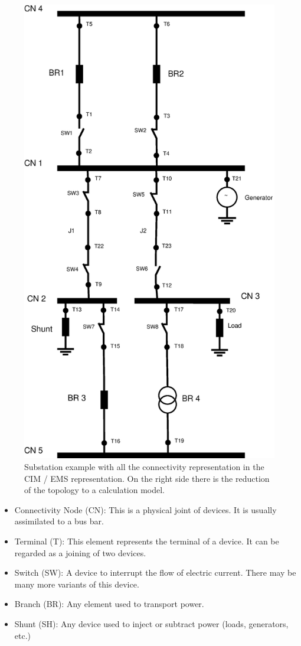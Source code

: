\documentclass[nols,a4paper,twoside,notoc,fleqn]{tufte-book}
\begin{document}
\begin{figure}
	\includegraphics[width=0.99\linewidth]{img/Substation.eps}
	\caption{Substation example with all the connectivity representation in the CIM / EMS representation. On the right side there is the reduction of the topology to a calculation model.}
	\label{substation_model}
\end{figure}

\begin{itemize}
	\item Connectivity Node (CN): This is a physical joint of devices. It is usually assimilated to a bus bar.
	\item Terminal (T): This element represents the terminal of a device. It can be regarded as a joining of two devices.
	\item Switch (SW): A device to interrupt the flow of electric current. There may be many more variants of this device.
	\item Branch (BR): Any element used to transport power.
	\item Shunt (SH): Any device used to inject or subtract power (loads, generators, etc.)
\end{itemize}
\end{document}

